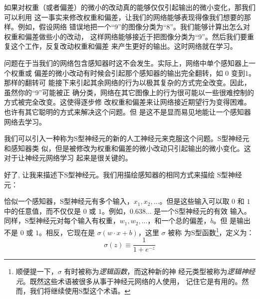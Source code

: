 如果对权重（或者偏差）的微小的改动真的能够仅仅引起输出的微小变化，那我们可以利用
这一事实来修改权重和偏差，让我们的网络能够表现得像我们想要的那样。例如，假设网络
错误地把一个``9''的图像分类为``8''。我们能够计算出怎么对权重和偏差做些小的改动，
这样网络能够接近于把图像分类为``9''。然后我们要重复这个工作，反复改动权重和偏差
来产生更好的输出。这时网络就在学习。

问题在于当我们的网络包含感知器时这不会发生。实际上，网络中单个感知器上一个权重或
偏差的微小改动有时候会引起那个感知器的输出完全翻转，如 $0$ 变到$1$。那样的翻转可
能接下来引起其余网络的行为以极其复杂的方式完全改变。因此，虽然你的``9''可能被正
确分类，网络在其它图像上的行为很可能以一些很难控制的方式被完全改变。这使得逐步修
改权重和偏差来让网络接近期望行为变得困难。也许有其它聪明的方式来解决这个问题。但
是这不是显而易见地能让一个感知器网络去学习。

我们可以引入一种称为S型神经元的新的人工神经元来克服这个问题。S型神经元和感知器类
似，但是被修改为权重和偏差的微小改动只引起输出的微小变化。这对于让神经元网络学习
起来是很关键的。

好了, 让我来描述下S型神经元。我们用描绘感知器的相同方式来描绘
S型神经元：
\begin{center}
\end{center}

恰似一个感知器，S型神经元有多个输入，$x_1,x_2,\ldots$。但是这些输入可以取 $0$ 和
$1$ 中的任意值，而不仅仅是 $0$ 或 $1$。例如，$0.638\ldots$ 是一个S型神经元的有效
输入。同样，S型神经元对每个输入有权重，$w_1,w_2,\ldots$，和一个总的偏差，$b$。但
是输出不是 $0$ 或 $1$。相反，它现在是 $\sigma(w \cdot x+b)$，这里 $\sigma$ 被称
为S型函数\footnote{顺便提一下，$\sigma$ 有时被称为\emph{逻辑函数}，而这种新的神
  经元类型被称为\emph{逻辑神经元}。既然这些术语被很多从事于神经元网络的人使用，
  记住它是有用的。然而，我们将继续使用S型这个术语。}，定义为：
\begin{equation}
  \sigma(z) \equiv \frac{1}{1+e^{-z}}
  \label{eq:3}\tag{3}
\end{equation}

